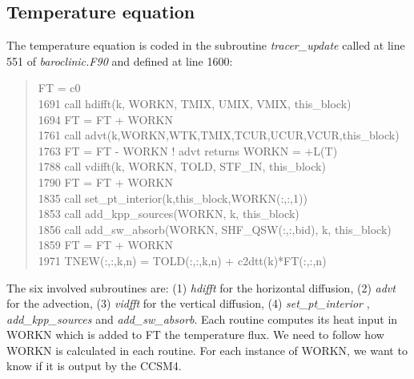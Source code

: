 \begin{appendices}
\subsection{Temperature equation}\label{aTE}

The temperature equation is coded in the subroutine \textit{tracer\_update} called at line 551 of \textit{baroclinic.F90} and defined at line 1600: 
\begin{quotation}
\small
\linespread{0.5}\selectfont{} \hspace{1em} FT    = c0\\
1691  \hspace{1em} call hdifft(k, WORKN, TMIX, UMIX, VMIX, this\_block)\\
1694 \hspace{1em}  FT = FT + WORKN\\
 1761 \hspace{1em} call advt(k,WORKN,WTK,TMIX,TCUR,UCUR,VCUR,this\_block)\\
 1763 \hspace{1em} FT = FT - WORKN   ! advt returns WORKN = +L(T) \\
1788 \hspace{1em}  call vdifft(k, WORKN, TOLD, STF\_IN, this\_block)\\
1790 \hspace{1em}  FT = FT + WORKN\\
 1835\hspace{1em}  call set\_pt\_interior(k,this\_block,WORKN(:,:,1))\\
1853 \hspace{1em}  call add\_kpp\_sources(WORKN, k, this\_block)\\
 1856 \hspace{1em} call add\_sw\_absorb(WORKN, SHF\_QSW(:,:,bid), k, this\_block)\\
1859 \hspace{1em}  FT = FT + WORKN\\
1971 \hspace{1em} TNEW(:,:,k,n) = TOLD(:,:,k,n) + c2dtt(k)*FT(:,:,n)
\end{quotation}

The six involved subroutines are: (1) \textit{hdifft} for the horizontal diffusion, (2) \textit{advt} for the advection, (3) \textit{vidfft} for the vertical diffusion, (4) \textit{set\_pt\_interior} , \textit{add\_kpp\_sources} and \textit{add\_sw\_absorb}. Each routine computes its heat input in WORKN which is added to FT the temperature flux. We need to follow how WORKN is calculated in each routine. For each instance of WORKN, we want to know if it is output by the CCSM4.



\end{appendices}
